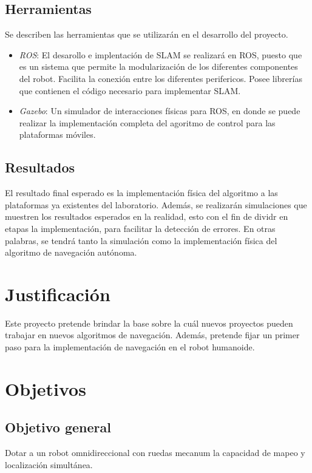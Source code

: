 \subsection{Herramientas}
Se describen las herramientas que se utilizarán en el desarrollo del proyecto.

\begin{itemize}
\item \textit{ROS}: El desarollo e implentación de SLAM se realizará en ROS, puesto que es un sistema que permite la modularización de los diferentes componentes del robot. Facilita la conexión entre los diferentes perifericos. Posee librerías que contienen el código necesario para implementar SLAM.
\item \textit{Gazebo}: Un simulador de interacciones físicas para ROS, en donde se puede realizar la implementación completa del agoritmo de control para las plataformas móviles.
\end{itemize}

\subsection{Resultados}
El resultado final esperado es la implementación física del algoritmo a las plataformas ya existentes del laboratorio. Además, se realizarán simulaciones que muestren los resultados esperados en la realidad, esto con el fin de dividr en etapas la implementación, para facilitar la detección de errores. En otras palabras, se tendrá tanto la simulación como la implementación física del algoritmo de navegación autónoma.

\section{Justificación}
Este proyecto pretende brindar la base sobre la cuál nuevos proyectos pueden trabajar en nuevos algoritmos de navegación. Además, pretende fijar un primer paso para la implementación de navegación en el robot humanoide.

\section{Objetivos}

\subsection{Objetivo general}
Dotar a un robot omnidireccional con ruedas mecanum la capacidad de mapeo y localización simultánea.


